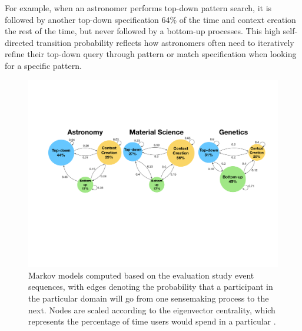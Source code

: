 For example, when an astronomer performs top-down pattern search,
it is followed by another top-down specification
64\% of the time and context creation the rest of the time,
but never followed by a bottom-up processes.
This high self-directed transition probability
reflects how astronomers often need to iteratively
refine their top-down query through pattern
or match specification when looking for a specific pattern. %
\begin{figure}[h!]
  \includegraphics[width=\linewidth]{figures/markov_transition.pdf}
  \caption{Markov models computed based on the evaluation study event sequences, with edges denoting the probability that a participant in the particular domain will go from one sensemaking process to the next. Nodes are scaled according to the eigenvector centrality, which represents the percentage of time users would spend in a particular .}\label{fig:transition}
\end{figure}
